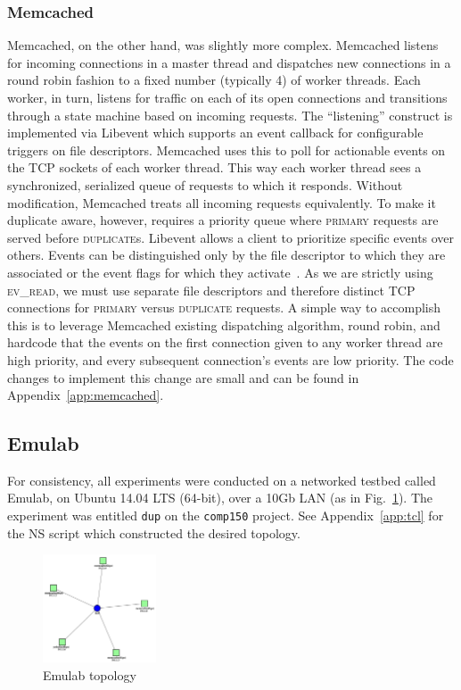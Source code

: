 \documentclass[11pt,titlepage]{article}
\begin{document}
\subsubsection{Memcached}

Memcached, on the other hand, was slightly more complex.  Memcached listens for
incoming connections in a master thread and dispatches new connections in a
round robin fashion to a fixed number (typically 4) of worker threads. Each
worker, in turn, listens for traffic on each of its open connections and
transitions through a state machine based on incoming requests.  The
``listening'' construct is implemented via Libevent which supports an event
callback for configurable triggers on file descriptors. Memcached uses this to
poll for actionable events on the TCP sockets of each worker thread.  This way
each worker thread sees a synchronized, serialized queue of requests to which it
responds. Without modification, Memcached treats all incoming requests
equivalently. To make it duplicate aware, however, requires a priority queue
where \textsc{primary} requests are served before \textsc{duplicate}s. Libevent
allows a client to prioritize specific events over others. Events can be
distinguished only by the file descriptor to which they are associated or the
event flags for which they activate~\citep{libevent_priority}. As we are strictly
using \textsc{ev\_read}, we must use separate file descriptors and therefore
distinct TCP connections for \textsc{primary} versus \textsc{duplicate}
requests. A simple way to accomplish this is to leverage Memcached existing
dispatching algorithm, round robin, and hardcode that the events on the first
connection given to any worker thread are high priority, and every subsequent
connection's events are low priority. The code changes to implement this change
are small and can be found in Appendix~\ref{app:memcached}.

\subsection{Emulab}

For consistency, all experiments were conducted on a networked testbed called
Emulab, on Ubuntu 14.04 LTS (64-bit), over a 10Gb LAN (as in
Fig.~\ref{topology}). The experiment was entitled \texttt{dup} on the
\texttt{comp150} project. See Appendix~\ref{app:tcl} for the NS script which
constructed the desired topology.

\begin{figure}[h!]
  \centering
  \includegraphics[width=0.3\textwidth]{topology.png}
  \caption[Emulab topology]{Emulab topology}
  \label{topology}
\end{figure}
 
\end{document}
